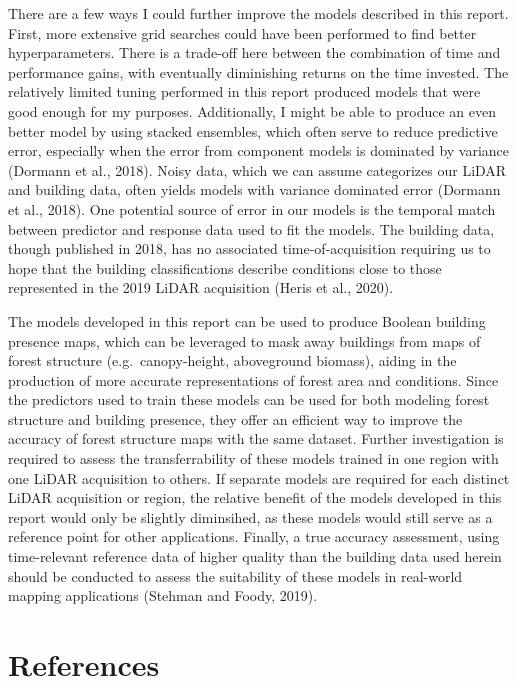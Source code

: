 \documentclass[]{elsarticle} %
\begin{document}
There are a few ways I could further improve the models described in this
report.
First, more extensive grid searches could have been performed to find better
hyperparameters.
There is a trade-off here between the combination of time
and performance gains, with eventually diminishing returns on the time invested.
The relatively limited tuning performed in this report produced models that were
good enough for my purposes.
Additionally, I might be able to produce an even better model by using
stacked ensembles, which often serve to reduce predictive error, especially
when the error from component models is dominated by variance (Dormann et al., 2018).
Noisy data, which we can assume categorizes our LiDAR and building data, often
yields models with variance dominated error (Dormann et al., 2018).
One potential source of error in our models is the temporal match between
predictor and response data used to fit the models.
The building data, though published in 2018, has no associated
time-of-acquisition requiring us to hope that the building classifications
describe conditions close to those represented in the 2019 LiDAR acquisition
(Heris et al., 2020).

The models developed in this report can be used to produce Boolean building
presence maps, which can be leveraged to mask away buildings from maps of forest
structure (e.g.~canopy-height, aboveground biomass),
aiding in the production of more accurate representations of forest area and
conditions.
Since the predictors used to train these models can be used for both modeling
forest structure and building presence, they offer an efficient way to
improve the accuracy of forest structure maps with the same dataset.
Further investigation is required to assess the transferrability of these models
trained in one region with one LiDAR acquisition to others.
If separate models are required for each distinct LiDAR acquisition or region,
the relative benefit of the models developed in this report would only be
slightly diminsihed, as these models would still serve as a reference point for
other applications.
Finally, a true accuracy assessment, using time-relevant reference data of
higher quality than the building data used herein should be conducted to assess
the suitability of these models in real-world mapping applications
(Stehman and Foody, 2019).

\newpage{}

\hypertarget{references}{%
\section*{References}\label{references}}
\end{document}
